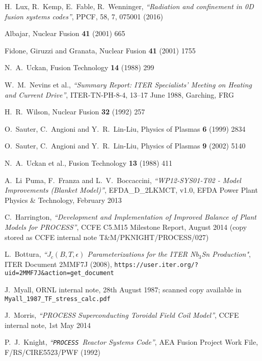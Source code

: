 \documentclass[11pt,a4paper]{report}
\newcommand{\process}{\mbox{\texttt{PROCESS}}}
\begin{document}
\begin{thebibliography}{99}
H.~Lux, R.~Kemp, E.~Fable, R.~Wenninger,
\textit{``Radiation and confinement in 0D fusion systems codes''},
 PPCF, 58, 7, 075001 (2016)


Albajar,
Nuclear Fusion \textbf{41} (2001) 665

Fidone, Giruzzi and Granata,
Nuclear Fusion \textbf{41} (2001) 1755

N.\ A.\ Uckan,
Fusion Technology \textbf{14} (1988) 299

W.\ M.\ Nevins et al.,
\textit{``Summary Report: ITER Specialists' Meeting on Heating and
Current Drive''},
ITER-TN-PH-8-4,
13--17 June 1988, Garching, FRG

H.\ R.\ Wilson,
Nuclear Fusion \textbf{32} (1992) 257

O.\ Sauter, C.\ Angioni and Y.\ R.\ Lin-Liu,
Physics of Plasmas \textbf{6} (1999) 2834

O.\ Sauter, C.\ Angioni and Y.\ R.\ Lin-Liu,
Physics of Plasmas \textbf{9} (2002) 5140

N.\ A.\ Uckan et al.,
Fusion Technology \textbf{13} (1988) 411

A.\ Li~Puma, F.\ Franza and L.\ V.\ Boccaccini, \textit{``WP12-SYS01-T02 -
  Model Improvements (Blanket Model)''},
EFDA\_D\_2LKMCT, v1.0, EFDA Power Plant Physics \& Technology, February 2013

C.\ Harrington,
\textit{``Development and Implementation of Improved
  Balance of Plant Models for PROCESS''},
CCFE C5.M15 Milestone Report, August 2014 (copy stored as CCFE internal note
T\&M/PKNIGHT/PROCESS/027)

L.\ Bottura,
\textit{``$J_c(B,T,\epsilon)$ Parameterizations for the ITER Nb$_3$Sn
  Production"},
ITER Document 2MMF7J (2008),
\texttt{https://user.iter.org/?uid=2MMF7J\&action=get\_document}

J.\ Myall,
ORNL internal note, 28th August 1987; scanned copy available in
\texttt{Myall\_1987\_TF\_stress\_calc.pdf}

J.\ Morris,
\textit{``PROCESS Superconducting Toroidal Field Coil Model''},
CCFE internal note, 1st May 2014

P.\ J.\ Knight,
\textit{``\process\ Reactor Systems Code''},
AEA Fusion Project Work File, F/RS/CIRE5523/PWF
(1992)


\end{thebibliography}
\end{document}
